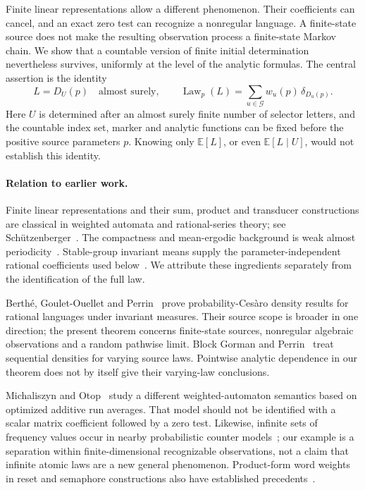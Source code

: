 \documentclass[11pt]{article}
\theoremstyle{definition}
\theoremstyle{remark}
\newcommand{\E}{\mathbb E}
\newcommand{\Law}{\operatorname{Law}}
\newcommand{\Gap}{\mathcal G}
\begin{document}
Finite linear representations allow a different phenomenon. Their coefficients can cancel, and an exact zero test can recognize a nonregular language. A finite-state source does not make the resulting observation process a finite-state Markov chain. We show that a countable version of finite initial determination nevertheless survives, uniformly at the level of the analytic formulas. The central assertion is the identity
\begin{equation}\label{eq:central-intro}
 L=D_U(p)\quad\text{almost surely},
 \qquad \Law_p(L)=\sum_{u\in\Gap}w_u(p)\,\delta_{D_u(p)}.
\end{equation}
Here $U$ is determined after an almost surely finite number of selector letters, and the countable index set, marker and analytic functions can be fixed before the positive source parameters $p$. Knowing only $\E[L]$, or even $\E[L\mid U]$, would not establish this identity.

\paragraph{Relation to earlier work.}
Finite linear representations and their sum, product and transducer constructions are classical in weighted automata and rational-series theory; see Sch\"utzenberger~\cite{Schutzenberger1961}. The compactness and mean-ergodic background is weak almost periodicity~\cite{Eberlein1949,Grothendieck1952,Sine1974WAP}. Stable-group invariant means supply the parameter-independent rational coefficients used below~\cite[Corollary 4.15]{Conant2021Stability}. We attribute these ingredients separately from the identification of the full law.

Berth\'e, Goulet-Ouellet and Perrin~\cite[Theorem 20]{BertheGouletOuelletPerrin2025Density} prove probability-Ces\`aro density results for rational languages under invariant measures. Their source scope is broader in one direction; the present theorem concerns finite-state sources, nonregular algebraic observations and a random pathwise limit. Block Gorman and Perrin~\cite{BlockGormanPerrin2026Sequential} treat sequential densities for varying source laws. Pointwise analytic dependence in our theorem does not by itself give their varying-law conclusions.

Michaliszyn and Otop~\cite{MichaliszynOtop2019Markov} study a different weighted-automaton semantics based on optimized additive run averages. That model should not be identified with a scalar matrix coefficient followed by a zero test. Likewise, infinite sets of frequency values occur in nearby probabilistic counter models~\cite{Kucera2015Existence}; our example is a separation within finite-dimensional recognizable observations, not a claim that infinite atomic laws are a new general phenomenon. Product-form word weights in reset and semaphore constructions also have established precedents~\cite{RhodesSchillingSilva2016Semaphore}.
\end{document}
